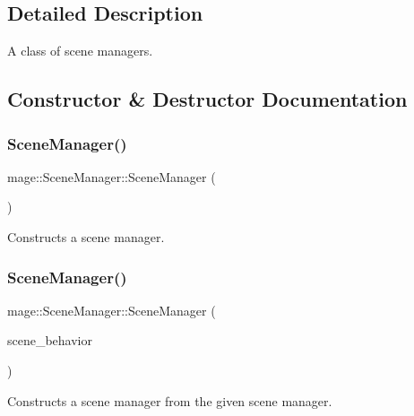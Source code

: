\subsection{Detailed Description}
A class of scene managers. 

\subsection{Constructor \& Destructor Documentation}
\hypertarget{classmage_1_1_scene_manager_aa505da85a4d49ea4b2fcda16559f5700}{}\label{classmage_1_1_scene_manager_aa505da85a4d49ea4b2fcda16559f5700} 
\subsubsection{\texorpdfstring{Scene\+Manager()}{SceneManager()}\hspace{0.1cm}{\footnotesize\ttfamily [1/3]}}
{\footnotesize\ttfamily mage\+::\+Scene\+Manager\+::\+Scene\+Manager (\begin{DoxyParamCaption}{ }\end{DoxyParamCaption})\hspace{0.3cm}{\ttfamily [noexcept]}}

Constructs a scene manager. \hypertarget{classmage_1_1_scene_manager_a450ce8e4d52483a2dcc3bb090f565373}{}\label{classmage_1_1_scene_manager_a450ce8e4d52483a2dcc3bb090f565373} 
\subsubsection{\texorpdfstring{Scene\+Manager()}{SceneManager()}\hspace{0.1cm}{\footnotesize\ttfamily [2/3]}}
{\footnotesize\ttfamily mage\+::\+Scene\+Manager\+::\+Scene\+Manager (\begin{DoxyParamCaption}\item[{const \hyperlink{classmage_1_1_scene_manager}{Scene\+Manager} \&}]{scene\+\_\+behavior }\end{DoxyParamCaption})\hspace{0.3cm}{\ttfamily [delete]}}

Constructs a scene manager from the given scene manager.


